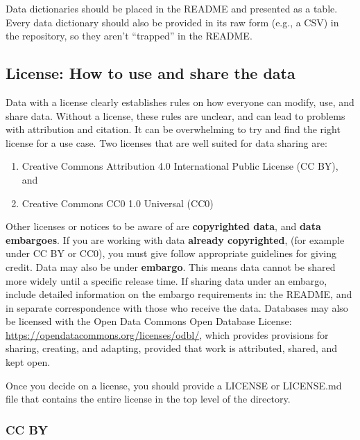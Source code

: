 \documentclass[
]{article}
\providecommand{\tightlist}{%
  \setlength{\itemsep}{0pt}\setlength{\parskip}{0pt}}
\begin{document}
Data dictionaries should be placed in the README and presented as a table. Every data dictionary should also be provided in its raw form (e.g., a CSV) in the repository, so they aren't ``trapped'' in the README.

\hypertarget{license}{%
\subsection{License: How to use and share the data}\label{license}}

Data with a license clearly establishes rules on how everyone can modify, use, and share data. Without a license, these rules are unclear, and can lead to problems with attribution and citation. It can be overwhelming to try and find the right license for a use case. Two licenses that are well suited for data sharing are:

\begin{enumerate}
\def\labelenumi{\arabic{enumi}.}
\tightlist
\item
  Creative Commons Attribution 4.0 International Public License (CC BY), and
\item
  Creative Commons CC0 1.0 Universal (CC0)
\end{enumerate}

Other licenses or notices to be aware of are \textbf{copyrighted data}, and \textbf{data embargoes}. If you are working with data \textbf{already copyrighted}, (for example under CC BY or CC0), you must give follow appropriate guidelines for giving credit. Data may also be under \textbf{embargo}. This means data cannot be shared more widely until a specific release time. If sharing data under an embargo, include detailed information on the embargo requirements in: the README, and in separate correspondence with those who receive the data. Databases may also be licensed with the Open Data Commons Open Database License: \url{https://opendatacommons.org/licenses/odbl/}, which provides provisions for sharing, creating, and adapting, provided that work is attributed, shared, and kept open.

Once you decide on a license, you should provide a LICENSE or LICENSE.md file that contains the entire license in the top level of the directory.

\hypertarget{cc-by}{%
\subsubsection{CC BY}\label{cc-by}}
\end{document}
